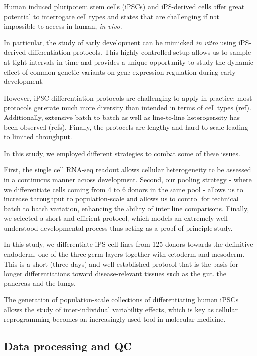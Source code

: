 Human induced pluripotent stem cells (iPSCs) and iPS-derived cells offer great potential to interrogate cell types and states that are challenging if not impossible to access in human, \textit{in vivo}.

In particular, the study of early development can be mimicked \textit{in vitro} using iPS-derived differentiation protocols. 
This highly controlled setup allows us to sample at tight intervals in time and provides a unique opportunity to study the dynamic effect of common genetic variants on gene expression regulation during early development.

However, iPSC differentiation protocols are challenging to apply in practice: most protocols generate much more diversity than intended in terms of cell types (ref). 
Additionally, extensive batch to batch as well as line-to-line heterogeneity has been observed (refs). Finally, the protocols are lengthy and hard to scale leading to limited throughput. 
 
In this study, we employed different strategies to combat some of these issues. 

First, the single cell RNA-seq readout allows cellular heterogeneity to be assessed in a continuous manner across development.
Second, our pooling strategy - where we differentiate cells coming from 4 to 6 donors in the same pool - allows us to increase throughput to population-scale and allows us to control for technical batch to batch variation, enhancing the ability of inter line comparisons.
Finally, we selected a short and efficient protocol, which models an extremely well understood developmental process thus acting as a proof of principle study.

In this study, we differentiate iPS cell lines from 125 donors towards the definitive endoderm, one of the three germ layers together with ectoderm and mesoderm. 
This is a short (three days) and well-established protocol that is the basis for longer differentiations toward disease-relevant tissues such as the gut, the pancreas and the lungs.

The generation of population-scale collections of differentiating human iPSCs allows the study of inter-individual variability effects, which is key as cellular reprogramming becomes an increasingly used tool in molecular medicine.

\subsection{Data processing and QC}

